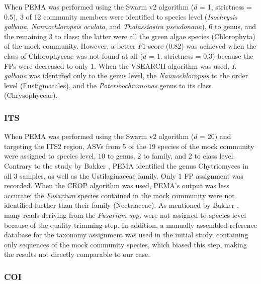    When PEMA was performed using the Swarm v2 algorithm ($d$ = 1, strictness = 0.5), 3 of 12 community members were identified to species level (\textit{Isochrysis galbana}, \textit{Nannochloropsis oculata}, and \textit{Thalassiosira pseudonana}), 6 to genus, and the remaining 3 to class; 
   the latter were all the green algae species (Chlorophyta) of the mock community. 
   However, a better $F1$-score ($0.82$) was achieved when the class of Chlorophyceae was not found at all ($d$ = 1, strictness = 0.3) because the FPs were decreased to only $1$. 
   When the VSEARCH algorithm was used, \textit{I. galbana} was identified only to the genus level, the \textit{Nannochloropsis} to the order level (Eustigmatales), and the \textit{Poterioochromonas} genus to its class (Chrysophyceae).


   \subsubsection*{ITS}

   When PEMA was performed using the Swarm v2 algorithm ($d$ = 20) and targeting the ITS2 region, ASVs from 5 of the 19 species of the mock community were assigned to species level, $10$ to genus, $2$ to family, and $2$ to class level. 
   Contrary to the study by Bakker \citep{bakker2018fungal}, PEMA identified the genus Chytriomyces in all $3$ samples, as well as the Ustilaginaceae family. 
   Only $1$ FP assignment was recorded. 
   When the CROP algorithm was used, PEMA's output was less accurate; 
   the \textit{Fusarium} species contained in the mock community were not identified further than their family (Nectriaceae). 
   As mentioned by Bakker \citep{bakker2018fungal}, many reads deriving from the \textit{Fusarium spp.} were not assigned to species level because of the quality-trimming step. 
   In addition, a manually assembled reference database for the taxonomy assignment was used in the initial study, containing only sequences of the mock community species, which biased this step, making the results not directly comparable to our case.


   \subsubsection*{COI}

